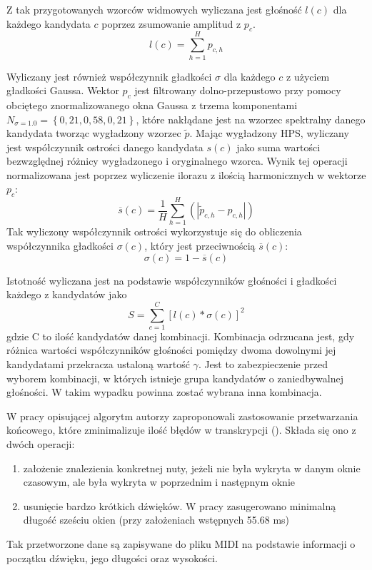 \documentclass[12pt,a4paper,twoside]{mwart}
\begin{document}
Z tak przygotowanych wzorców widmowych wyliczana jest głośność $l(c)$ dla każdego kandydata $c$ poprzez zsumowanie amplitud z $p_c$.
\begin{equation}\label{eq:inharmonicity:loudness}
  l(c) = \sum_{h=1}^H p_{c,h}
\end{equation}

Wyliczany jest również współczynnik gładkości $\sigma$ dla każdego $c$ z użyciem gładkości Gaussa. Wektor $p_c$ jest filtrowany dolno-przepustowo przy pomocy obciętego znormalizowanego okna Gaussa z trzema komponentami $N_{\sigma = 1.0} = \left\{0,21, 0,58, 0,21\right\}$, które nakłądane jest na wzorzec spektralny danego kandydata tworząc wygładzony wzorzec $\widetilde{p}$. Mając wygładzony HPS, wyliczany jest współczynnik ostrości danego kandydata $s(c)$ jako suma wartości bezwzględnej różnicy wygładzonego i oryginalnego wzorca. Wynik tej operacji normalizowana jest poprzez wyliczenie ilorazu z ilością harmonicznych w wektorze $p_c$:
\begin{equation}\label{eq:inharmonicity:sharpness}
  \overline{s}(c) = \frac{1}{H}\sum_{h=1}^H \left(\left|\widetilde{p}_{c,h} - p_{c,h}\right|\right)
\end{equation}
Tak wyliczony współczynnik ostrości wykorzystuje się do obliczenia współczynnika gładkości $\sigma(c)$, który jest przeciwnością $\overline{s}(c)$:
\begin{equation}\label{eq:inharmonicity:smoothnes}
  \sigma(c) = 1 - \overline{s}(c) 
\end{equation}

Istotność wyliczana jest na podstawie współczynników głośności i gładkości każdego z kandydatów jako
\begin{equation}\label{eq:inharmonicity:salience}
  S = \sum_{c=1}^C\left[l(c)*\sigma(c)\right]^2
\end{equation}
gdzie C to ilość kandydatów danej kombinacji. Kombinacja  odrzucana jest, gdy różnica wartości współczynników głośności pomiędzy dwoma dowolnymi jej kandydatami przekracza ustaloną wartość $\gamma$. Jest to zabezpieczenie przed wyborem kombinacji, w których istnieje grupa kandydatów o zaniedbywalnej głośności. W takim wypadku powinna zostać wybrana inna kombinacja.

W pracy opisującej algorytm autorzy zaproponowali zastosowanie przetwarzania końcowego, które zminimalizuje ilość błędów w transkrypcji (\cite[106-107]{Transcription:Pertus:Inharmonicity}). Składa się ono z dwóch operacji:
\begin{enumerate}
  \item założenie znalezienia konkretnej nuty, jeżeli nie była wykryta w danym oknie czasowym, ale była wykryta w poprzednim i następnym oknie
  \item usunięcie bardzo krótkich dźwięków. W pracy zasugerowano minimalną długość sześciu okien (przy założeniach wstępnych 55.68 ms)
\end{enumerate}
Tak przetworzone dane są zapisywane do pliku MIDI na podstawie informacji o początku dźwięku, jego długości oraz wysokości.
\end{document}
